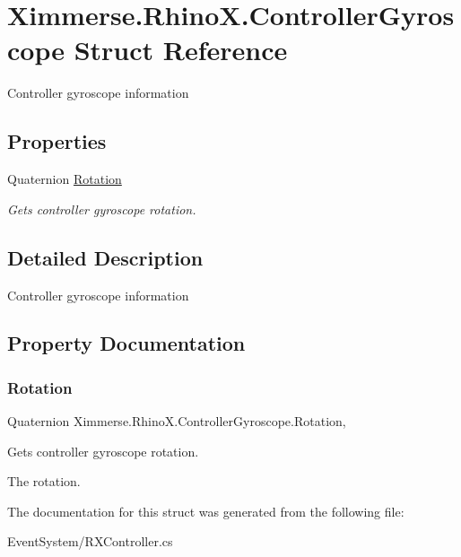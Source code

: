 \hypertarget{struct_ximmerse_1_1_rhino_x_1_1_controller_gyroscope}{}\section{Ximmerse.\+Rhino\+X.\+Controller\+Gyroscope Struct Reference}
\label{struct_ximmerse_1_1_rhino_x_1_1_controller_gyroscope}


Controller gyroscope information  


\subsection*{Properties}
\begin{DoxyCompactItemize}
\item 
Quaternion \mbox{\hyperlink{struct_ximmerse_1_1_rhino_x_1_1_controller_gyroscope_a694963cea4f05271994cf1ffcaae5dec}{Rotation}}
\begin{DoxyCompactList}\small\item\em Gets controller gyroscope rotation. \end{DoxyCompactList}\end{DoxyCompactItemize}


\subsection{Detailed Description}
Controller gyroscope information 



\subsection{Property Documentation}
\mbox{\label{struct_ximmerse_1_1_rhino_x_1_1_controller_gyroscope_a694963cea4f05271994cf1ffcaae5dec}} 
\subsubsection{\texorpdfstring{Rotation}{Rotation}}
{\footnotesize\ttfamily Quaternion Ximmerse.\+Rhino\+X.\+Controller\+Gyroscope.\+Rotation\hspace{0.3cm}{\ttfamily [get]}, {\ttfamily [set]}}



Gets controller gyroscope rotation. 

The rotation.

The documentation for this struct was generated from the following file\+:\begin{DoxyCompactItemize}
\item 
Event\+System/R\+X\+Controller.\+cs\end{DoxyCompactItemize}
